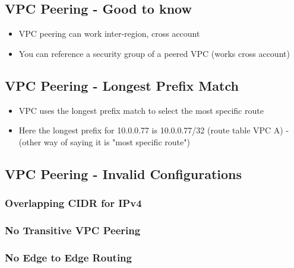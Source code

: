 \subsection{VPC Peering - Good to know}
\begin{itemize}
    \item VPC peering can work inter-region, cross account
    \item You can reference a security group of a peered VPC (works cross account)
\end{itemize}

\subsection{VPC Peering - Longest Prefix Match}
\begin{itemize}
    \item VPC uses the longest prefix match to select the most specific route
    \item Here the longest prefix for 10.0.0.77 is 10.0.0.77/32 (route table VPC A)
    - (other way of saying it is "most specific route")
\end{itemize}

\subsection{VPC Peering - Invalid Configurations}

\subsubsection{Overlapping CIDR for IPv4}

\subsubsection{No Transitive VPC Peering}

\subsubsection{No Edge to Edge Routing}


